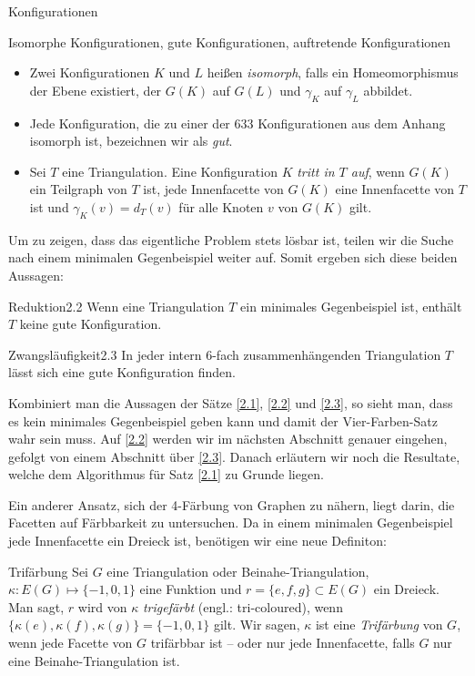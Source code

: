 \begin{section}{Konfigurationen}
 \begin{definition}{Isomorphe Konfigurationen, gute Konfigurationen, auftretende Konfigurationen}
 \-\ 
  \begin{itemize}
   \item Zwei Konfigurationen $K$ und $L$ heißen \textit{isomorph}, falls ein Homeomorphismus der Ebene existiert, der $G(K)$ auf $G(L)$ und $\gamma_K$ auf $\gamma_L$ abbildet. 
   \item Jede Konfiguration, die zu einer der 633 Konfigurationen aus dem Anhang isomorph ist, bezeichnen wir als \textit{gut}. 
   \item Sei $T$ eine Triangulation. Eine Konfiguration $K$ \textit{tritt in $T$ auf}, wenn $G(K)$ ein Teilgraph von $T$ ist, jede Innenfacette von $G(K)$ eine Innenfacette von $T$ ist und $\gamma_K(v) = d_T(v)$ für alle Knoten $v$ von $G(K)$ gilt.
  \end{itemize}

 \end{definition}

 Um zu zeigen, dass das eigentliche Problem stets lösbar ist, teilen wir die Suche nach einem minimalen Gegenbeispiel weiter auf. Somit ergeben sich diese beiden Aussagen:
   
 \begin{satzl}{Reduktion}{2.2}
  Wenn eine Triangulation $T$ ein minimales Gegenbeispiel ist, enthält $T$ keine gute Konfiguration.
 \end{satzl}
   
 \begin{satzl}{Zwangsläufigkeit}{2.3}
  In jeder intern 6-fach zusammenhängenden Triangulation $T$ lässt sich eine gute Konfiguration finden.
 \end{satzl}
   
 Kombiniert man die Aussagen der Sätze \ref{2.1}, \ref{2.2} und \ref{2.3}, so sieht man, dass es kein minimales Gegenbeispiel geben kann und damit der Vier-Farben-Satz wahr sein muss. Auf \ref{2.2} werden wir im nächsten Abschnitt genauer eingehen, gefolgt von einem Abschnitt über \ref{2.3}. Danach erläutern wir noch die Resultate, welche dem Algorithmus für Satz \ref{2.1} zu Grunde liegen.
 
 Ein anderer Ansatz, sich der 4-Färbung von Graphen zu nähern, liegt darin, die Facetten auf Färbbarkeit zu untersuchen. Da in einem minimalen Gegenbeispiel jede Innenfacette ein Dreieck ist, benötigen wir eine neue Definiton:
 
 \begin{definition}{Trifärbung}
  Sei $G$ eine Triangulation oder Beinahe-Triangulation, $\kappa:E(G) \mapsto \{-1,0,1\}$ eine Funktion und $r=\{e,f,g\} \subset E(G)$ ein Dreieck. Man sagt, $r$ wird von $\kappa$ \textit{trigefärbt} (engl.: tri-coloured), wenn $\{\kappa(e),\kappa(f),\kappa(g)\} = \{-1,0,1\}$ gilt. Wir sagen, $\kappa$ ist eine \textit{Trifärbung} von $G$, wenn jede Facette von $G$ trifärbbar ist -- oder nur jede Innenfacette, falls $G$ nur eine Beinahe-Triangulation ist.
 \end{definition}


\end{section}
